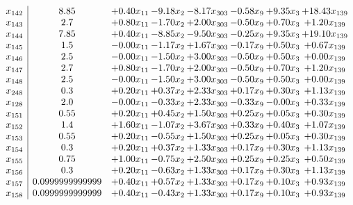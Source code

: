 \documentclass[8pt]{article}
\begin{document}
\[\begin{array}{c| c c@{\hskip 2pt} c@{\hskip 2pt} c@{\hskip 2pt} c@{\hskip 2pt} c@{\hskip 2pt} c@{\hskip 2pt} }
 x_{142}   &  8.85 & +  0.40 x_{11} & -9.18 x_{2} & -8.17 x_{303} & -0.58 x_{9} & +  9.35 x_{3} & + 18.43 x_{139}\\
 x_{143}   &  2.7 & +  0.80 x_{11} & -1.70 x_{2} & +  2.00 x_{303} & -0.50 x_{9} & +  0.70 x_{3} & +  1.20 x_{139}\\
 x_{144}   &  7.85 & +  0.40 x_{11} & -8.85 x_{2} & -9.50 x_{303} & -0.25 x_{9} & +  9.35 x_{3} & + 19.10 x_{139}\\
 x_{145}   &  1.5 & -0.00 x_{11} & -1.17 x_{2} & +  1.67 x_{303} & -0.17 x_{9} & +  0.50 x_{3} & +  0.67 x_{139}\\
 x_{146}   &  2.5 & -0.00 x_{11} & -1.50 x_{2} & +  3.00 x_{303} & -0.50 x_{9} & +  0.50 x_{3} & +  0.00 x_{139}\\
 x_{147}   &  2.7 & +  0.80 x_{11} & -1.70 x_{2} & +  2.00 x_{303} & -0.50 x_{9} & +  0.70 x_{3} & +  1.20 x_{139}\\
 x_{148}   &  2.5 & -0.00 x_{11} & -1.50 x_{2} & +  3.00 x_{303} & -0.50 x_{9} & +  0.50 x_{3} & +  0.00 x_{139}\\
 x_{248}   &  0.3 & +  0.20 x_{11} & +  0.37 x_{2} & +  2.33 x_{303} & +  0.17 x_{9} & +  0.30 x_{3} & +  1.13 x_{139}\\
 x_{128}   &  2.0 & -0.00 x_{11} & -0.33 x_{2} & +  2.33 x_{303} & -0.33 x_{9} & -0.00 x_{3} & +  0.33 x_{139}\\
 x_{151}   &  0.55 & +  0.20 x_{11} & +  0.45 x_{2} & +  1.50 x_{303} & +  0.25 x_{9} & +  0.05 x_{3} & +  0.30 x_{139}\\
 x_{152}   &  1.4 & +  1.60 x_{11} & -1.07 x_{2} & +  3.67 x_{303} & +  0.33 x_{9} & +  0.40 x_{3} & +  1.07 x_{139}\\
 x_{153}   &  0.55 & +  0.20 x_{11} & -0.55 x_{2} & +  1.50 x_{303} & +  0.25 x_{9} & +  0.05 x_{3} & +  0.30 x_{139}\\
 x_{154}   &  0.3 & +  0.20 x_{11} & +  0.37 x_{2} & +  1.33 x_{303} & +  0.17 x_{9} & +  0.30 x_{3} & +  1.13 x_{139}\\
 x_{155}   &  0.75 & +  1.00 x_{11} & -0.75 x_{2} & +  2.50 x_{303} & +  0.25 x_{9} & +  0.25 x_{3} & +  0.50 x_{139}\\
 x_{156}   &  0.3 & +  0.20 x_{11} & -0.63 x_{2} & +  1.33 x_{303} & +  0.17 x_{9} & +  0.30 x_{3} & +  1.13 x_{139}\\
 x_{157}   &  0.0999999999999 & +  0.40 x_{11} & +  0.57 x_{2} & +  1.33 x_{303} & +  0.17 x_{9} & +  0.10 x_{3} & +  0.93 x_{139}\\
 x_{158}   &  0.0999999999999 & +  0.40 x_{11} & -0.43 x_{2} & +  1.33 x_{303} & +  0.17 x_{9} & +  0.10 x_{3} & +  0.93 x_{139}\\

\end{array}\]
\end{document}
